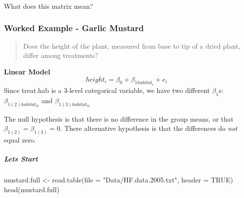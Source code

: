 \documentclass[
]{article}
\newenvironment{Shaded}{\begin{snugshade}}{\end{snugshade}}
\newcommand{\AttributeTok}[1]{\textcolor[rgb]{0.77,0.63,0.00}{#1}}
\newcommand{\ConstantTok}[1]{\textcolor[rgb]{0.00,0.00,0.00}{#1}}
\newcommand{\FunctionTok}[1]{\textcolor[rgb]{0.00,0.00,0.00}{#1}}
\newcommand{\NormalTok}[1]{#1}
\newcommand{\OtherTok}[1]{\textcolor[rgb]{0.56,0.35,0.01}{#1}}
\newcommand{\StringTok}[1]{\textcolor[rgb]{0.31,0.60,0.02}{#1}}
\begin{document}
What does this matrix mean?

\hypertarget{worked-example---garlic-mustard}{%
\subsubsection{Worked Example - Garlic
Mustard}\label{worked-example---garlic-mustard}}

\begin{quote}
Does the height of the plant, measured from base to tip of a dried
plant, differ among treatments?
\end{quote}

\textbf{Linear Model}
\[ height_i = \beta_0 + \beta_{1habitat_i} + e_i \] Since treat.hab is a
3-level categorical variable, we have two different \(\beta_1\)s:
\(\beta_{1(2)habitat_{2i}}\) and \(\beta_{1(3)habitat_{3i}}\)

The null hypothesis is that there is no difference in the group means,
or that \(\beta_{1(2)} = \beta_{1(3)} = 0\). There alternative
hypothesis is that the differences do \emph{not} equal zero.

\hypertarget{lets-start}{%
\subparagraph{Lets Start}\label{lets-start}}

\begin{Shaded}
\begin{Highlighting}[]
\NormalTok{mustard.full }\OtherTok{\textless{}{-}} \FunctionTok{read.table}\NormalTok{(}\AttributeTok{file =} \StringTok{"Data/HF.data.2005.txt"}\NormalTok{, }\AttributeTok{header =} \ConstantTok{TRUE}\NormalTok{)}
\FunctionTok{head}\NormalTok{(mustard.full)}
\end{Highlighting}
\end{Shaded}
\end{document}
